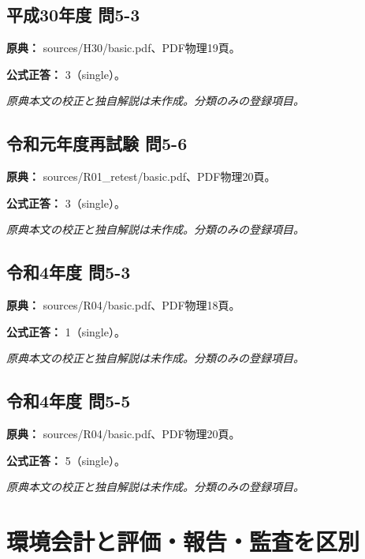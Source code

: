 \subsection{平成30年度 問5-3}
\label{q:h30-reg-basic-5-3}

\noindent\textbf{原典：} sources/H30/basic.pdf、PDF物理19頁。

\textbf{公式正答：} 3（single）。

\par\textit{原典本文の校正と独自解説は未作成。分類のみの登録項目。}

\subsection{令和元年度再試験 問5-6}
\label{q:r01-ret-basic-5-6}

\noindent\textbf{原典：} sources/R01\_retest/basic.pdf、PDF物理20頁。

\textbf{公式正答：} 3（single）。

\par\textit{原典本文の校正と独自解説は未作成。分類のみの登録項目。}

\subsection{令和4年度 問5-3}
\label{q:r04-reg-basic-5-3}

\noindent\textbf{原典：} sources/R04/basic.pdf、PDF物理18頁。

\textbf{公式正答：} 1（single）。

\par\textit{原典本文の校正と独自解説は未作成。分類のみの登録項目。}

\subsection{令和4年度 問5-5}
\label{q:r04-reg-basic-5-5}

\noindent\textbf{原典：} sources/R04/basic.pdf、PDF物理20頁。

\textbf{公式正答：} 5（single）。

\par\textit{原典本文の校正と独自解説は未作成。分類のみの登録項目。}

\section{環境会計と評価・報告・監査を区別}

